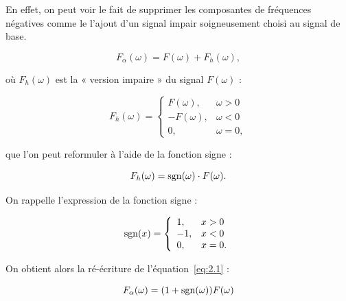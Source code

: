 En effet, on peut voir le fait de supprimer les composantes de fréquences négatives comme le l'ajout d'un signal impair soigneusement choisi au signal de base.

\begin{equation} \label{eq:2.1}
    F_{\alpha}(\omega) = F(\omega) + F_h(\omega),
\end{equation}

où $F_h(\omega)$ est la « version impaire » du signal $F(\omega)$ :

\begin{equation}
    F_h(\omega) = \left\{
    \begin{array}{ll}
        F(\omega), & \omega > 0 \\
        -F(\omega), & \omega < 0 \\
        0, & \omega = 0,
    \end{array}
    \right.
\end{equation}

que l'on peut reformuler à l'aide de la fonction signe :

\begin{equation}
    F_h(\omega) = \operatorname{sgn}(\omega)\cdot F(\omega).
    \label{eq:2.5}
\end{equation}

On rappelle l'expression de la fonction signe :

\begin{equation}
    \operatorname{sgn}(x) = \left\{
    \begin{array}{ll}
        1, & x > 0 \\
        -1, & x < 0 \\
        0, & x = 0.
    \end{array}
    \right.
\end{equation}

On obtient alors la ré-écriture de l'équation~\ref{eq:2.1} :

\begin{equation}
    F_{\alpha}(\omega) = (1+\operatorname{sgn}(\omega))F(\omega)
\end{equation}

